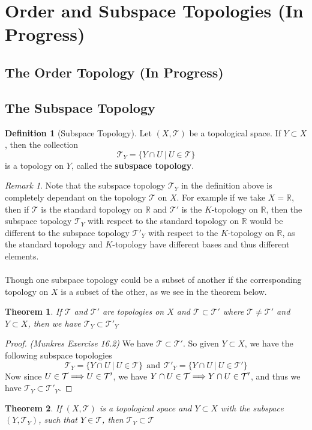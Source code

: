 \documentclass{article}
\newtheorem{theorem}{Theorem}[section]
\theoremstyle{remark}
\newtheorem*{remark}{Remark}
\theoremstyle{definition}
\newtheorem{definition}{Definition}[section]
\newcommand{\simplies}{\DOTSB\Longrightarrow}
\begin{document}
\newpage

\section{Order and Subspace Topologies (In Progress)}

\bigskip

\subsection{The Order Topology (In Progress)}
\bigskip
\subsection{The Subspace Topology}
\begin{definition}[Subspace Topology]
Let $(X, \mathcal{T})$ be a topological space. If $Y \subset X$, then the collection $$\mathcal{T}_Y = \{ Y \cap U \ | \  U \in \mathcal{T}\}$$ is a topology on $Y$, called the \textbf{subspace topology}.
\end{definition}
\medskip
\begin{remark}
Note that the subspace topology $\mathcal{T}_Y$ in the definition above is completely dependant on the topology $\mathcal{T}$ on $X$. For example if we take $X = \mathbb{R}$, then if $\mathcal{T}$ is the standard topology on $\mathbb{R}$ and $\mathcal{T'}$ is the $K$-topology on $\mathbb{R}$, then the subspace topology $\mathcal{T}_Y$ with respect to the standard topology on $\mathbb{R}$ would be different to the subspace topology $\mathcal{T'}_Y$ with respect to the $K$-topology on $\mathbb{R}$, as the standard topology and $K$-topology have different bases and thus different elements. \\ \\Though one subspace topology could be a subset of another if the corresponding topology on $X$ is a subset of the other, as we see in the theorem below.
\end{remark}
\medskip
\begin{theorem}
If $\mathcal{T}$ and $\mathcal{T'}$ are topologies on $X$ and $\mathcal{T} \subset \mathcal{T'}$ where $\mathcal{T} \neq \mathcal{T'}$ and $Y \subset X$, then we have $\mathcal{T}_Y \subset \mathcal{T'}_Y$
\end{theorem}

\begin{proof}
\textit{(Munkres Exercise 16.2)} We have $\mathcal{T} \subset \mathcal{T'}$. So given $Y \subset X$, we have the following subspace topologies $$\mathcal{T}_Y = \{Y \cap U \ | \ U \in \mathcal{T}\} \ \ \text{and} \ \ \mathcal{T'}_Y = \{ Y \cap U \ | \ U \in \mathcal{T'}\}$$
Now since $U \in \mathcal{T} \simplies U \in \mathcal{T'}$, we have $Y \cap U \in \mathcal{T} \simplies Y \cap U \in \mathcal{T'}$, and thus we have $\mathcal{T}_Y \subset \mathcal{T'}_Y$.
\end{proof}
\medskip
\begin{theorem}
If $(X, \mathcal{T})$ is a topological space and $Y \subset X$ with the subspace $(Y, \mathcal{T}_Y)$, such that $Y \in \mathcal{T}$, then $ \mathcal{T}_Y \subset \mathcal{T}$
\end{theorem}
\end{document}
